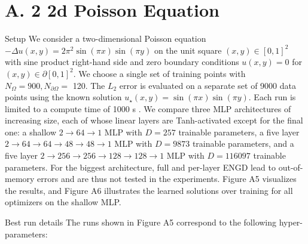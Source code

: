 \documentclass[10pt]{article}
\begin{document}
\section*{A. 2 2d Poisson Equation}
Setup We consider a two-dimensional Poisson equation $-\Delta u(x, y)=2 \pi^{2} \sin (\pi x) \sin (\pi y)$ on the unit square $(x, y) \in[0,1]^{2}$ with sine product right-hand side and zero boundary conditions $u(x, y)=0$ for $(x, y) \in \partial[0,1]^{2}$. We choose a single set of training points with $N_{\Omega}=900, N_{\partial \Omega}=$ 120. The $L_{2}$ error is evaluated on a separate set of 9000 data points using the known solution $u_{\star}(x, y)=\sin (\pi x) \sin (\pi y)$. Each run is limited to a compute time of 1000 s . We compare three MLP architectures of increasing size, each of whose linear layers are Tanh-activated except for the final one: a shallow $2 \rightarrow 64 \rightarrow 1$ MLP with $D=257$ trainable parameters, a five layer $2 \rightarrow 64 \rightarrow 64 \rightarrow 48 \rightarrow 48 \rightarrow 1$ MLP with $D=9873$ trainable parameters, and a five layer $2 \rightarrow 256 \rightarrow 256 \rightarrow 128 \rightarrow 128 \rightarrow 1$ MLP with $D=116097$ trainable parameters. For the biggest architecture, full and per-layer ENGD lead to out-of-memory errors and are thus not tested in the experiments. Figure A5 visualizes the results, and Figure A6 illustrates the learned solutions over training for all optimizers on the shallow MLP.

Best run details The runs shown in Figure A5 correspond to the following hyper-parameters:
\end{document}
